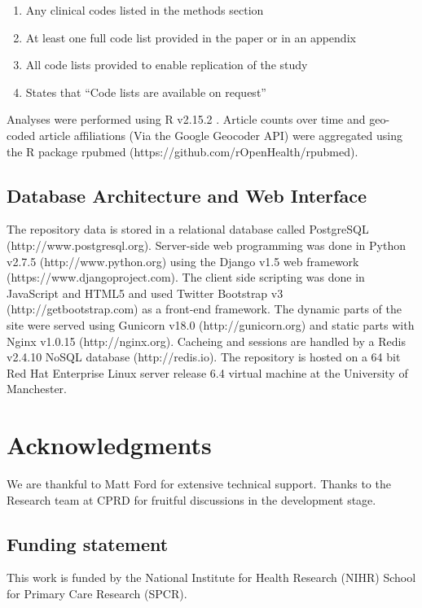 \documentclass[10pt]{article}
\begin{document}
\begin{enumerate}
    \item Any clinical codes listed in the methods section
    \item At least one full code list provided in the paper or in an appendix
    \item All code lists provided to enable replication of the study
    \item States that ``Code lists are available on request'' 
\end{enumerate}

Analyses were performed using R v2.15.2 \cite{R2012}. Article counts over time and geo-coded article affiliations (Via the Google Geocoder API) were aggregated using the R package rpubmed (https://github.com\slash rOpenHealth/rpubmed).

\subsection*{Database Architecture and Web Interface}

The repository data is stored in a relational database called PostgreSQL (http://www.postgresql.org). Server-side web programming was done in Python v2.7.5 (http://www.python.org) using the Django v1.5 web framework (https://www.djangoproject.com). The client side scripting was done in JavaScript and HTML5 and used Twitter Bootstrap v3 (http://getbootstrap.com) as a front-end framework.  The dynamic parts of the site were served using Gunicorn v18.0 (http://gunicorn.org) and static parts with Nginx v1.0.15 (http://nginx.org). Cacheing and sessions are handled by a Redis v2.4.10 NoSQL database (http://redis.io). The repository is hosted on a 64 bit Red Hat Enterprise Linux server release 6.4 virtual machine at the University of Manchester. 


\section*{Acknowledgments}
We are thankful to Matt Ford for extensive technical support. Thanks to the Research team at CPRD for fruitful discussions in the development stage.

\subsection*{Funding statement}
This work is funded by the National Institute for Health Research (NIHR) School for Primary Care Research (SPCR).
\end{document}
